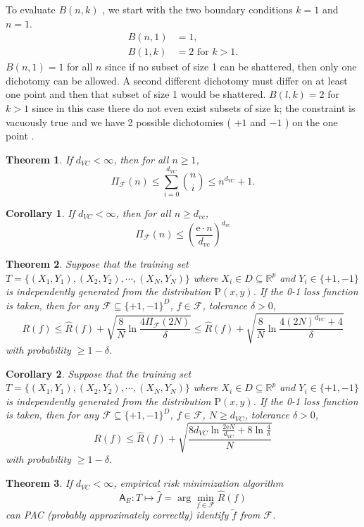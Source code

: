 \documentclass{report}
\newtheorem{corollary}{Corollary}[chapter]
\newtheorem{theorem}{Theorem}[chapter]
\theoremstyle{nonumberplain}
\newcommand{\0}{\mathbf{0}}
\begin{document}
To evaluate $B(n, k)$ , we start with the two boundary conditions
$k = 1$ and $n = 1$.
\[
\begin{aligned} B(n, 1) &=1, \\
 B(1,k) &=2 \text { for } k>1. \end{aligned}
\]
$B(n,1) = 1$ for all $n$ since if no subset of size 1 can be shattered, then only one dichotomy can be allowed. A second different dichotomy must differ on at least one point and then that subset of size 1 would be shattered. $B(l,k) = 2$ for $k > 1$ since in this case there do not even exist subsets of size k; the constraint is vacuously true and we have 2 possible dichotomies ( $+1$ and $-1$ ) on the one point .
\begin{theorem}
	If $d_{VC}<\infty$, then for all $n\ge1$,
	\[
	\Pi_{\mathcal{F}}(n) \le \sum_{i=0}^{d_{VC}}\binom{n}{i}\le n^{d_{VC}}+1.
	\]
\end{theorem}

\begin{corollary}
	If $d_{VC}<\infty$, then for all $n\ge d_{vc}$,
	\[
	\Pi_{\mathcal{F}}(n) \le\left(\frac{\mathrm{e}\cdot n }{d_{vc}}\right)^{d_{vc}}
	\]
\end{corollary}
\begin{theorem}
Suppose that the training set $T=\{(X_1,Y_1),(X_2,Y_2),\cdots,(X_{N},Y_{N})\}$ where $X_i\in D\subseteq\mathbb{R}^p$ and $Y_i\in\{+1,-1\}$ is  independently generated from the distribution $\mathrm{P}(x,y)$. If the 0-1 loss function is taken, then for any $\mathcal{F}\subseteq\{+1,-1\}^D$, $f\in\mathcal{F}$, tolerance $\delta > 0$,
\[
R(f) \le \widehat{R}(f)+\sqrt{\frac{8}{N} \ln \frac{4 \Pi_{\mathcal{F}}(2N)}{\delta}}\le\widehat{R}(f) +\sqrt{\frac{8}{N} \ln \frac{4 (2N)^{d_{VC}}+4}{\delta}}
\]
with probability $\ge 1-\delta$.
\end{theorem}
\begin{corollary}
	Suppose that the training set $T=\{(X_1,Y_1),(X_2,Y_2),\cdots,(X_{N},Y_{N})\}$ where $X_i\in D\subseteq\mathbb{R}^p$ and $Y_i\in\{+1,-1\}$ is  independently generated from the distribution $\mathrm{P}(x,y)$. If the 0-1 loss function is taken, then for any $\mathcal{F}\subseteq\{+1,-1\}^D$, $f\in\mathcal{F}$, $N\ge d_{VC}$, tolerance $\delta > 0$,
	\[
	R(f) \le \widehat{R}(f)+\sqrt{\frac{8 d_{VC} \ln \frac{2 \mathrm{e} N}{d_{VC}}+8 \ln \frac{4}{\delta}}{N}}
	\]
	with probability $\ge 1-\delta$.
\end{corollary}

\begin{theorem}
	If $d_{VC}<\infty$, empirical risk minimization algorithm 
	$$\mathsf{A}_E:T\longmapsto \hat{f}=\arg\min_{f\in\mathcal{F}}\widehat{R}(f) $$
	can PAC (probably approximately correctly) identify $\tilde{f}$ from $\mathcal{F}$.
\end{theorem}
\end{document}

